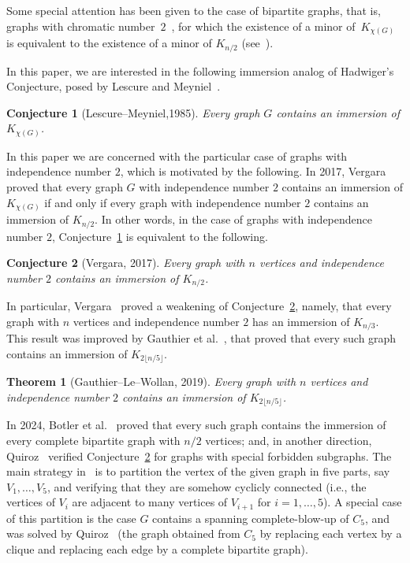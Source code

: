 \documentclass[a4paper,12pt]{article}
\newtheorem{theorem}{Theorem}
\newtheorem{conjecture}{Conjecture}
\begin{document}
Some special attention has been given to the case of bipartite graphs, 
that is, graphs with chromatic number~\(2\)~\cite{seymour2016hadwiger},
for which the existence of a minor of~\(K_{\chi(G)}\) is equivalent to the existence of a minor of \(K_{n/2}\) (see~\cite{plummer2003special}).

In this paper, we are interested in the following immersion analog of Hadwiger's Conjecture, 
posed by Lescure and Meyniel~\cite{lescure41problem}.

\begin{conjecture}[Lescure--Meyniel,1985]\label{conj:LescureMeyniel}
	Every graph \(G\) contains an immersion of \(K_{\chi(G)}\).
\end{conjecture}

In this paper we are concerned with the particular case of graphs with independence number \(2\),
which is motivated by the following.
In 2017, Vergara~\cite{vergara2017complete} proved that every graph \(G\) with independence number \(2\)
contains an immersion of \(K_{\chi(G)}\) if and only if every graph with independence number \(2\) contains an immersion of \(K_{n/2}\). 
In other words, in the case of graphs with independence number \(2\),
Conjecture~\ref{conj:LescureMeyniel} is equivalent to the following.

\begin{conjecture}[Vergara, 2017]\label{conj:vergara}
	Every graph with \(n\) vertices and independence number \(2\)
	contains an immersion of \(K_{n/2}\).
\end{conjecture}

In particular, Vergara~\cite{vergara2017complete} proved a weakening of Conjecture~\ref{conj:vergara},
namely, that every graph with \(n\) vertices and independence number \(2\) has an immersion of \(K_{n/3}\).
This result was improved by Gauthier et al.~\cite{gauthier2019forcing},
that proved that every such graph contains an immersion of \(K_{2\lfloor n/5\rfloor}\).

\begin{theorem}[Gauthier--Le--Wollan, 2019]\label{thm:gauthier}
	Every graph with \(n\) vertices and independence number \(2\)
	contains an immersion of \(K_{2\lfloor n/5\rfloor}\).
\end{theorem}

In 2024, Botler et al.~\cite{botler2024biclique} proved that every such graph
contains the immersion of every complete bipartite graph with \(n/2\) vertices;
and, in another direction, Quiroz~\cite{quiroz2021clique} verified 
Conjecture~\ref{conj:vergara} for graphs with special forbidden subgraphs.
The main strategy in~\cite{botler2024biclique} is to partition the vertex of the given graph in
five parts, say \(V_1,\ldots, V_5\), and verifying that they are somehow cyclicly connected (i.e., the vertices of \(V_i\) are adjacent to many vertices of \(V_{i+1}\) for \(i=1,\ldots, 5\)). 
A special case of this partition is the case \(G\) contains a spanning complete-blow-up of \(C_5\),
and was solved by Quiroz~\cite{botler2024biclique} (the graph obtained from \(C_5\) by replacing each vertex by a clique and replacing each edge by a complete bipartite graph).
\end{document}
